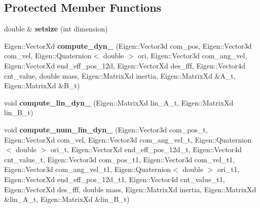 \subsection*{Protected Member Functions}
\begin{DoxyCompactItemize}
\item 
double \& {\bfseries setsize} (int dimension)\hypertarget{classdynamicgraph_1_1sot_1_1ReactiveLQRController_ab1b84af1283057d2877292b7dc80ca10}{}\label{classdynamicgraph_1_1sot_1_1ReactiveLQRController_ab1b84af1283057d2877292b7dc80ca10}

\item 
Eigen\+::\+Vector\+Xd {\bfseries compute\+\_\+dyn\+\_\+} (Eigen\+::\+Vector3d com\+\_\+pos, Eigen\+::\+Vector3d com\+\_\+vel, Eigen\+::\+Quaternion$<$ double $>$ ori, Eigen\+::\+Vector3d com\+\_\+ang\+\_\+vel, Eigen\+::\+Vector\+Xd end\+\_\+eff\+\_\+pos\+\_\+12d, Eigen\+::\+Vector\+Xd des\+\_\+fff, Eigen\+::\+Vector4d cnt\+\_\+value, double mass, Eigen\+::\+Matrix\+Xd inertia, Eigen\+::\+Matrix\+Xd \&A\+\_\+t, Eigen\+::\+Matrix\+Xd \&B\+\_\+t)\hypertarget{classdynamicgraph_1_1sot_1_1ReactiveLQRController_a3853bde8dab7bbf2c78b8583f991c7d3}{}\label{classdynamicgraph_1_1sot_1_1ReactiveLQRController_a3853bde8dab7bbf2c78b8583f991c7d3}

\item 
void {\bfseries compute\+\_\+lin\+\_\+dyn\+\_\+} (Eigen\+::\+Matrix\+Xd lin\+\_\+\+A\+\_\+t, Eigen\+::\+Matrix\+Xd lin\+\_\+\+B\+\_\+t)\hypertarget{classdynamicgraph_1_1sot_1_1ReactiveLQRController_abe026a8e8e754a0677e6c2a3690f5e7e}{}\label{classdynamicgraph_1_1sot_1_1ReactiveLQRController_abe026a8e8e754a0677e6c2a3690f5e7e}

\item 
void {\bfseries compute\+\_\+num\+\_\+lin\+\_\+dyn\+\_\+} (Eigen\+::\+Vector3d com\+\_\+pos\+\_\+t, Eigen\+::\+Vector\+Xd com\+\_\+vel, Eigen\+::\+Vector3d com\+\_\+ang\+\_\+vel\+\_\+t, Eigen\+::\+Quaternion$<$ double $>$ ori\+\_\+t, Eigen\+::\+Vector\+Xd end\+\_\+eff\+\_\+pos\+\_\+12d\+\_\+t, Eigen\+::\+Vector4d cnt\+\_\+value\+\_\+t, Eigen\+::\+Vector3d com\+\_\+pos\+\_\+t1, Eigen\+::\+Vector3d com\+\_\+vel\+\_\+t1, Eigen\+::\+Vector3d com\+\_\+ang\+\_\+vel\+\_\+t1, Eigen\+::\+Quaternion$<$ double $>$ ori\+\_\+t1, Eigen\+::\+Vector\+Xd end\+\_\+eff\+\_\+pos\+\_\+12d\+\_\+t1, Eigen\+::\+Vector4d cnt\+\_\+value\+\_\+t1, Eigen\+::\+Vector\+Xd des\+\_\+fff, double mass, Eigen\+::\+Matrix\+Xd inertia, Eigen\+::\+Matrix\+Xd \&lin\+\_\+\+A\+\_\+t, Eigen\+::\+Matrix\+Xd \&lin\+\_\+\+B\+\_\+t)\hypertarget{classdynamicgraph_1_1sot_1_1ReactiveLQRController_a647da9f56f0891d286837b011bdc2bf2}{}\label{classdynamicgraph_1_1sot_1_1ReactiveLQRController_a647da9f56f0891d286837b011bdc2bf2}


\end{DoxyCompactItemize}
